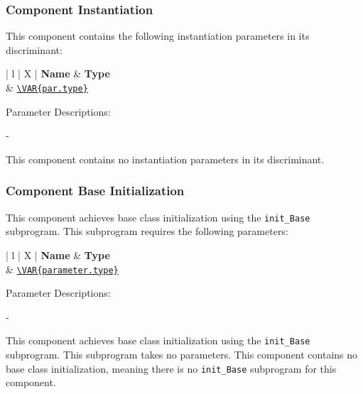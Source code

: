 \subsubsection{Component Instantiation}
This component contains the following instantiation parameters in its discriminant:

\begin{xltabular}{\textwidth}{ | l | X | }
  \hline
  \textbf{Name} & \textbf{Type} \\ \hline
  \texttt{} & \texttt{\url{\VAR{par.type}}}  \\ \hline
\end{xltabular}
\vspace{5mm} %

Parameter Descriptions:
\begin{spaceditemize}
  \item \textbf{\texttt{}} - 
\end{spaceditemize}
\vspace{5mm} %
This component contains no instantiation parameters in its discriminant.

\subsubsection{Component Base Initialization}
This component achieves base class initialization using the \texttt{init\_Base} subprogram. This subprogram requires the following parameters:

\begin{xltabular}{\textwidth}{ | l | X | }
  \hline
  \textbf{Name} & \textbf{Type} \\ \hline
  \texttt{} & \texttt{\url{\VAR{parameter.type}}}  \\ \hline
\end{xltabular}
\vspace{5mm} %

Parameter Descriptions:
\begin{spaceditemize}
  \item \textbf{\texttt{}} - 
\end{spaceditemize}
\vspace{5mm} %
This component achieves base class initialization using the \texttt{init\_Base} subprogram. This subprogram takes no parameters. 
This component contains no base class initialization, meaning there is no \texttt{init\_Base} subprogram for this component.


